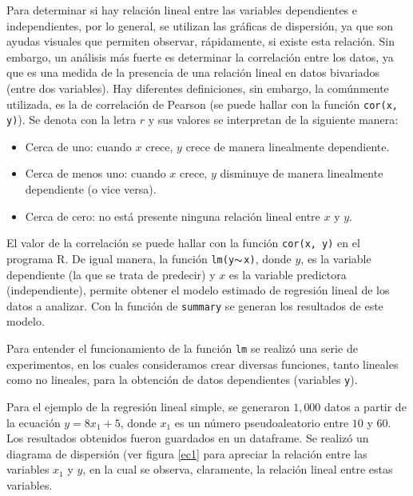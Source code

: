 \documentclass{article}
\begin{document}
Para determinar si hay relación lineal entre las variables dependientes e independientes, por lo general, se utilizan las gráficas de dispersión, ya que son ayudas visuales que permiten observar, rápidamente, si existe esta relación. Sin embargo, un análisis más fuerte es determinar la correlación entre los datos, ya que es una medida de la presencia de una relación lineal en datos bivariados (entre dos variables). Hay diferentes definiciones, sin embargo, la comúnmente utilizada, es la de correlación de Pearson (se puede hallar con la función \texttt{cor(x, y)}). Se denota con la letra $r$ y sus valores se interpretan de la siguiente manera:

\begin{itemize}
    \item Cerca de uno: cuando $x$ crece, $y$ crece de manera linealmente dependiente.
    \item Cerca de menos uno: cuando $x$ crece, $y$ disminuye de manera linealmente dependiente (o vice versa).
    \item Cerca de cero: no está presente ninguna relación lineal entre $x$ y $y$.
\end{itemize}

El valor de la correlación se puede hallar con la función \texttt{cor(x, y)} en el programa R. De igual manera, la función \texttt{lm(y$\thicksim$x)}, donde $y$, es la variable dependiente (la que se trata de predecir) y $x$ es la variable predictora (independiente), permite obtener el modelo estimado de regresión lineal de los datos a analizar. Con la función de \texttt{summary} se generan los resultados de este modelo.

Para entender el funcionamiento de la función \texttt{lm} se realizó una serie de experimentos, en los cuales consideramos crear diversas funciones, tanto lineales como no lineales, para la obtención de datos dependientes (variables \texttt{y}).

Para el ejemplo de la regresión lineal simple, se generaron $1,000$ datos a partir de la ecuación $y=8x_{1}+5$, donde $x_{1}$ es un número pseudoaleatorio entre $10$ y $60$. Los resultados obtenidos fueron guardados en un dataframe. Se realizó un diagrama de dispersión (ver figura \ref{ec1} para apreciar la relación entre las variables $x_{1}$ y $y$, en la cual se observa, claramente, la relación lineal entre estas variables.
\end{document}
